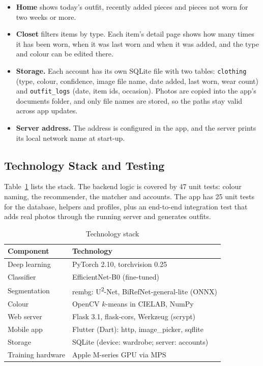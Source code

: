 \documentclass[conference]{IEEEtran}
\begin{document}
\begin{itemize}
  \item \textbf{Home} shows today's outfit, recently added pieces and pieces not worn for two weeks or more.
  \item \textbf{Closet} filters items by type. Each item's detail page shows how many times it has been worn, when it was last worn and when it was added, and the type and colour can be edited there.
  \item \textbf{Storage.} Each account has its own SQLite file with two tables: \texttt{clothing} (type, colour, confidence, image file name, date added, last worn, wear count) and \texttt{outfit\_logs} (date, item ids, occasion). Photos are copied into the app's documents folder, and only file names are stored, so the paths stay valid across app updates.
  \item \textbf{Server address.} The address is configured in the app, and the server prints its local network name at start-up.
\end{itemize}

\subsection{Technology Stack and Testing}
Table~\ref{tab:stack} lists the stack. The backend logic is covered by 47 unit tests: colour naming, the recommender, the matcher and accounts. The app has 25 unit tests for the database, helpers and profiles, plus an end-to-end integration test that adds real photos through the running server and generates outfits.

\begin{table}[t]
\caption{Technology stack}
\label{tab:stack}
\centering
\begin{tabular}{ll}
\toprule
Component & Technology \\
\midrule
Deep learning & PyTorch 2.10, torchvision 0.25 \\
Classifier & EfficientNet-B0 (fine-tuned) \\
Segmentation & rembg: U\textsuperscript{2}-Net, BiRefNet-general-lite (ONNX) \\
Colour & OpenCV $k$-means in CIELAB, NumPy \\
Web server & Flask 3.1, flask-cors, Werkzeug (scrypt) \\
Mobile app & Flutter (Dart): http, image\_picker, sqflite \\
Storage & SQLite (device: wardrobe; server: accounts) \\
Training hardware & Apple M-series GPU via MPS \\
\bottomrule
\end{tabular}
\end{table}
\end{document}
